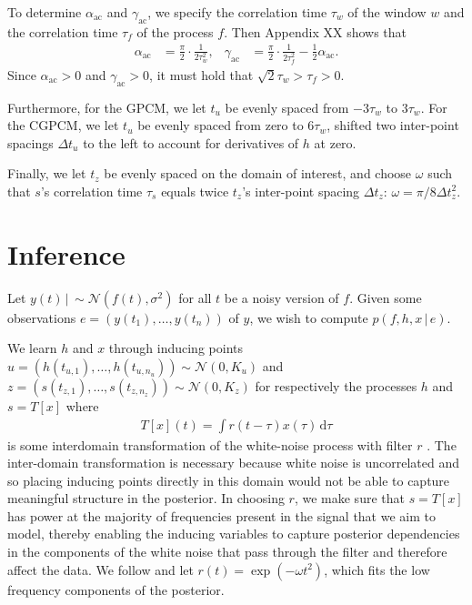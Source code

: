 \documentclass{article}
\renewcommand{\ss}[1]{_\text{#1}}         %
\newcommand{\id}[1]{\, \mathrm{d} #1}     %
\newcommand{\cond}{\, | \,}               %
\begin{document}
To determine $\alpha\ss{ac}$ and $\gamma\ss{ac}$, we specify the correlation time $\tau_w$ of the window $w$ and the correlation time $\tau_f$ of the process $f$. Then Appendix XX shows that
\begin{align*}
    \alpha\ss{ac} &= \frac{\pi}{2} \cdot \frac{1}{2 \tau_w^2},
    &\gamma\ss{ac} &= \frac{\pi}{2} \cdot \frac{1}{2 \tau^2_f} - \frac{1}{2} \alpha\ss{ac}.
\end{align*}
Since $\alpha\ss{ac} > 0$ and $\gamma\ss{ac} > 0$, it must hold that $\sqrt{2} \tau_w > \tau_f > 0$.

Furthermore, for the GPCM, we let $t_u$ be evenly spaced from $-3\tau_w$ to $3 \tau_w$. For the CGPCM, we let $t_u$ be evenly spaced from zero to $6 \tau_w$, shifted two inter-point spacings $\Delta t_u$ to the left to account for derivatives of $h$ at zero.

Finally, we let $t_z$ be evenly spaced on the domain of interest, and choose $\omega$ such that $s$'s correlation time $\tau_s$ equals twice $t_z$'s inter-point spacing $\Delta t_z$: $\omega = \pi / 8 \Delta t_z^2$.


\section{Inference}
\label{sec:inference}
Let $y(t)\cond \sim \mathcal{N}(f(t),\sigma^2)$ for all $t$ be a noisy version of $f$. Given some observations $e=(y(t_1),\ldots,y(t_n))$ of $y$, we wish to compute $p(f,h,x\cond e)$.

We learn $h$ and $x$ through inducing points \cite{Titsias:2009:Variational_Learning} $u=(h(t_{u,1}),\ldots,h(t_{u,n_u}))\sim \mathcal{N}(0,K_u)$ and $z=(s(t_{z,1}),\ldots,s(t_{z,n_z}))\sim \mathcal{N}(0,K_z)$ for respectively the processes $h$ and $s=T[x]$ where
\begin{align*}
    T[x](t)=\int r(t- \tau)x(\tau) \id{\tau}
\end{align*}
is some interdomain transformation of the white-noise process with filter $r$ \cite{Lazaro-Gredilla:2009:Inter-Domain_Gaussian_Processes_for_Sparse,Alvarez:2010:Efficient_Multioutput_Gaussian_Processes_Through,Tobar:2015:Learning_Stationary}. The inter-domain transformation is necessary because white noise is uncorrelated and so placing inducing points directly in this domain would not be able to capture meaningful structure in the posterior. In choosing $r$, we make sure that $s=T[x]$ has power at the majority of frequencies present in the signal that we aim to model, thereby enabling the inducing variables to capture posterior dependencies in the components of the white noise that pass through the filter and therefore affect the data. We follow \citet{Tobar:2015:Learning_Stationary} and let $r(t)=\exp(-\omega t^2)$, which fits the low frequency components of the posterior.
\end{document}
